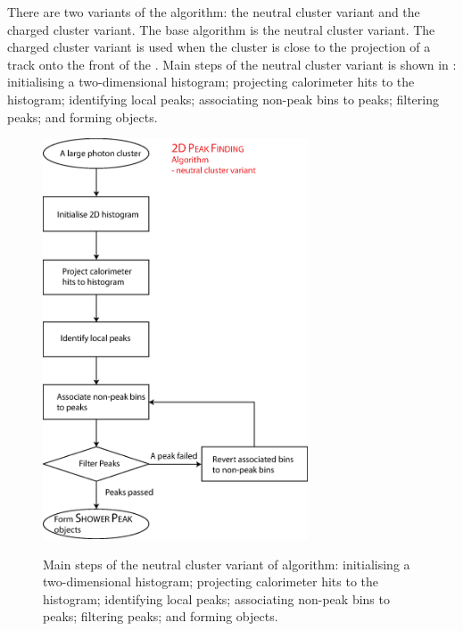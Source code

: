 
There are two variants of the \peakFinding algorithm: the neutral cluster variant and the charged cluster variant. The base algorithm is  the neutral cluster variant. The charged cluster variant is used when the cluster is close to the projection of a track onto the front of the \ECAL. Main steps of the  neutral cluster variant is shown in : initialising a two-dimensional histogram; projecting  calorimeter hits to the histogram; identifying local peaks; associating non-peak bins to peaks; filtering peaks; and forming \ShowerPeak objects.



\begin{figure}[tbph]
\centering
{\includegraphics[width=0.7\textwidth]{photon/2DpeakFinding2}}
\caption[Flow chart for \peakFinding algorithm neutral cluster variant.]
{Main steps of the  neutral cluster variant of \peakFinding algorithm: initialising a two-dimensional histogram; projecting  calorimeter hits to the histogram; identifying local peaks; associating non-peak bins to peaks; filtering peaks; and forming \ShowerPeak objects.}
\label{fig:photonPeakFindingFlowNeutral}
\end{figure}

